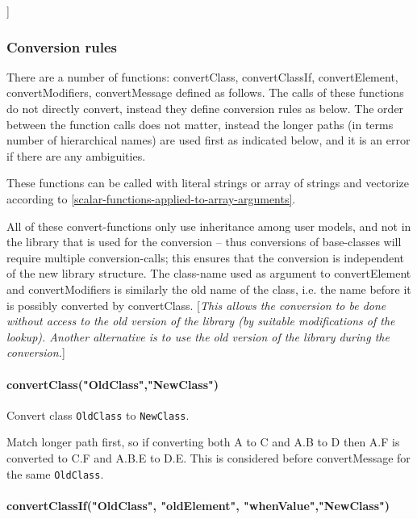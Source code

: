 {]}

\subsubsection{Conversion rules}

There are a number of functions: convertClass, convertClassIf,
convertElement, convertModifiers, convertMessage defined as follows. The
calls of these functions do not directly convert, instead they define
conversion rules as below. The order between the function calls does not
matter, instead the longer paths (in terms number of hierarchical names)
are used first as indicated below, and it is an error if there are any
ambiguities.

These functions can be called with literal strings or array of strings
and vectorize according to \autoref{scalar-functions-applied-to-array-arguments}.

All of these convert-functions only use inheritance among user
models, and not in the library that is used for the conversion -- thus
conversions of base-classes will require multiple conversion-calls; this
ensures that the conversion is independent of the new library structure.
The class-name used as argument to convertElement and convertModifiers
is similarly the old name of the class, i.e. the name before it is
possibly converted by convertClass. {[}\emph{This allows the conversion
to be done without access to the old version of the library (by suitable
modifications of the lookup). Another alternative is to use the old
version of the library during the conversion.}{]}

\paragraph*{convertClass("OldClass","NewClass")}

Convert class \lstinline!OldClass! to \lstinline!NewClass!.

Match longer path first, so if converting both A to C and A.B to D then
A.F is converted to C.F and A.B.E to D.E. This is considered before
convertMessage for the same \lstinline!OldClass!.

\paragraph*{convertClassIf("OldClass", "oldElement", "whenValue","NewClass")}

